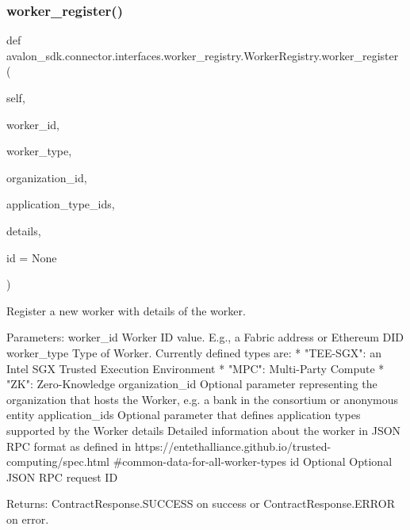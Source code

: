 \subsubsection{\texorpdfstring{worker\+\_\+register()}{worker\_register()}}
{\footnotesize\ttfamily def avalon\+\_\+sdk.\+connector.\+interfaces.\+worker\+\_\+registry.\+Worker\+Registry.\+worker\+\_\+register (\begin{DoxyParamCaption}\item[{}]{self,  }\item[{}]{worker\+\_\+id,  }\item[{}]{worker\+\_\+type,  }\item[{}]{organization\+\_\+id,  }\item[{}]{application\+\_\+type\+\_\+ids,  }\item[{}]{details,  }\item[{}]{id = {\ttfamily None} }\end{DoxyParamCaption})}

\begin{DoxyVerb}Register a new worker with details of the worker.

Parameters:
worker_id       Worker ID value. E.g., a Fabric address
        or Ethereum DID
worker_type     Type of Worker. Currently defined types are:
        * "TEE-SGX": an Intel SGX Trusted Execution
          Environment
        * "MPC": Multi-Party Compute
        * "ZK": Zero-Knowledge
organization_id Optional parameter representing the
        organization that hosts the Worker,
        e.g. a bank in the consortium or
        anonymous entity
application_ids Optional parameter that defines
        application types supported by the Worker
details         Detailed information about the worker in
        JSON RPC format as defined in
https://entethalliance.github.io/trusted-computing/spec.html
#common-data-for-all-worker-types
id              Optional Optional JSON RPC request ID

Returns:
ContractResponse.SUCCESS on success or
ContractResponse.ERROR on error.
\end{DoxyVerb}
 \mbox{\label{classavalon__sdk_1_1connector_1_1interfaces_1_1worker__registry_1_1WorkerRegistry_a2798a353672a2c5b154b3e856d00af02}} 
